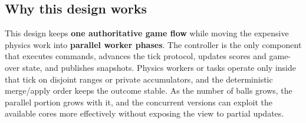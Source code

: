 \subsection{Why this design works}

This design keeps \textbf{one authoritative game flow} while moving the expensive physics work into \textbf{parallel worker phases}. The controller is the only component that executes commands, advances the tick protocol, updates scores and game-over state, and publishes snapshots. Physics workers or tasks operate only inside that tick on disjoint ranges or private accumulators, and the deterministic merge/apply order keeps the outcome stable. As the number of balls grows, the parallel portion grows with it, and the concurrent versions can exploit the available cores more effectively without exposing the view to partial updates.
